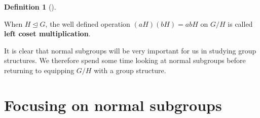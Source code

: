 \documentclass[10pt,]{book}
\newcommand{\terminology}[1]{\textbf{#1}}
\theoremstyle{plain}
\theoremstyle{definition}
\newtheorem{definition}[theorem]{Definition}
\theoremstyle{definition}
\theoremstyle{definition}
\theoremstyle{definition}
\numberwithin{equation}{section}
\begin{document}
\begin{definition}[{}]\label{definition-63}

        When \(H\unlhd G\), the well defined operation
        \((aH)(bH)=abH\) on \(G/H\) is called \terminology{left coset
        multiplication}.
\end{definition}
\par

    It is clear that normal subgroups will be
    very important for us in studying group structures. We therefore
    spend some time looking at normal subgroups before returning to
    equipping \(G/H\) with a group structure.
\typeout{************************************************}
\typeout{************************************************}
\section[{Focusing on normal subgroups}]{Focusing on normal subgroups}\label{section-26}
\end{document}
